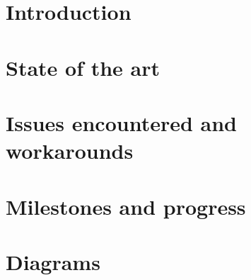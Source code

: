 \documentclass{article}
\begin{document}
\section{Introduction}

\section{State of the art}

\section{Issues encountered and workarounds}

\section{Milestones and progress}

\section{Diagrams}
\end{document}
